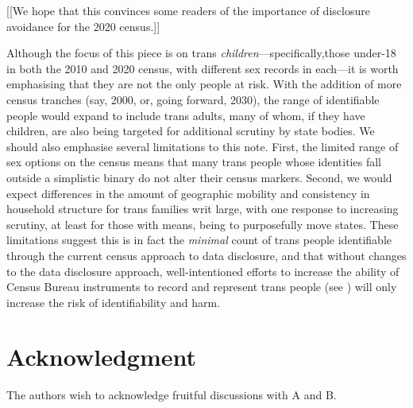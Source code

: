\documentclass{jpc} %
\theoremstyle{plain}\newtheorem{satz}[thm]{Satz} %
\begin{document}
[[We hope that this convinces some readers of the importance of disclosure avoidance for the 2020 census.]]

Although the focus of this piece is on trans \textit{children}---specifically,those under-18 in both the 2010 and 2020 census, with different sex records in each---it is worth emphasising that they are not the only people at risk. With the addition of more census tranches (say, 2000, or, going forward, 2030), the range of identifiable people would expand to include trans adults, many of whom, if they have children, are also being targeted for additional scrutiny by state bodies. We should also emphasise several limitations to this note. First, the limited range of sex options on the census means that many trans people whose identities fall outside a simplistic binary do not alter their census markers. Second, we would expect differences in the amount of geographic mobility and consistency in household structure for trans families writ large, with one response to increasing scrutiny, at least for those with means, being to purposefully move states. These limitations suggest this is in fact the \textit{minimal} count of trans people identifiable through the current census approach to data disclosure, and that without changes to the data disclosure approach, well-intentioned efforts to increase the ability of Census Bureau instruments to record and represent trans people (see \cite{whfactsheet}) will only increase the risk of identifiability and harm.


\section*{Acknowledgment}
  \noindent The authors wish to acknowledge fruitful discussions with
  A and B.





\appendix
\end{document}
